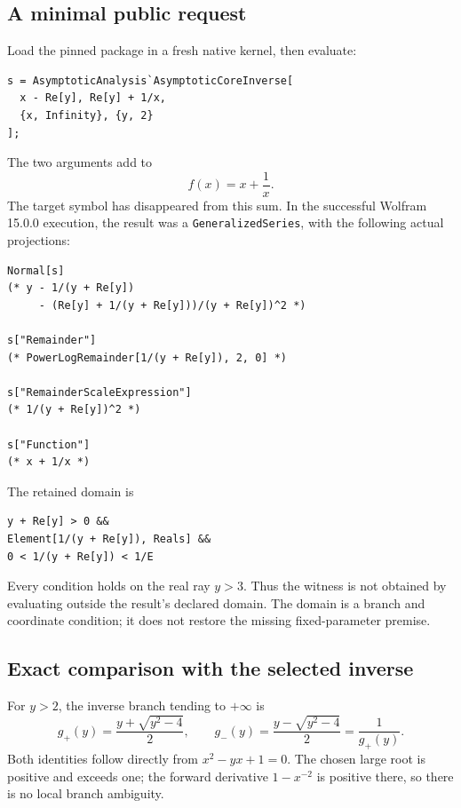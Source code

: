 \documentclass[11pt,letterpaper]{article}
\theoremstyle{remark}\newtheorem{remark}[theorem]{Remark}
\newcommand{\code}[1]{\texttt{#1}}
\begin{document}
\subsection{A minimal public request}
Load the pinned package in a fresh native kernel, then evaluate:
\begin{lstlisting}
s = AsymptoticAnalysis`AsymptoticCoreInverse[
  x - Re[y], Re[y] + 1/x,
  {x, Infinity}, {y, 2}
];
\end{lstlisting}
The two arguments add to
\begin{equation}\label{eq:original}
 f(x)=x+\frac1x.
\end{equation}
The target symbol has disappeared from this sum. In the successful Wolfram
15.0.0 execution, the result was a \code{GeneralizedSeries}, with the following
actual projections:
\begin{lstlisting}
Normal[s]
(* y - 1/(y + Re[y])
     - (Re[y] + 1/(y + Re[y]))/(y + Re[y])^2 *)

s["Remainder"]
(* PowerLogRemainder[1/(y + Re[y]), 2, 0] *)

s["RemainderScaleExpression"]
(* 1/(y + Re[y])^2 *)

s["Function"]
(* x + 1/x *)
\end{lstlisting}
The retained domain is
\begin{lstlisting}
y + Re[y] > 0 &&
Element[1/(y + Re[y]), Reals] &&
0 < 1/(y + Re[y]) < 1/E
\end{lstlisting}
Every condition holds on the real ray $y>3$. Thus the witness is not obtained
by evaluating outside the result's declared domain. The domain is a branch and
coordinate condition; it does not restore the missing fixed-parameter premise.

\subsection{Exact comparison with the selected inverse}
For $y>2$, the inverse branch tending to $+\infty$ is
\begin{equation}\label{eq:roots}
 g_+(y)=\frac{y+\sqrt{y^2-4}}2,\qquad
 g_-(y)=\frac{y-\sqrt{y^2-4}}2=\frac1{g_+(y)}.
\end{equation}
Both identities follow directly from $x^2-yx+1=0$. The chosen large root is
positive and exceeds one; the forward derivative $1-x^{-2}$ is positive
there, so there is no local branch ambiguity.
\end{document}
